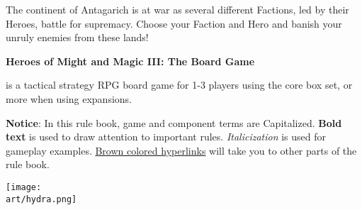 
\bigbreak

The continent of Antagarich is at war as several different Factions, led by their Heroes, battle for supremacy. Choose your Faction and Hero and banish your unruly enemies from these lands!

\hypertarget{Heroes of Might and Magic III}{\textbf{Heroes of Might and Magic III: The Board Game}} is a tactical strategy RPG board game for 1-3 players using the core box set, or more when using expansions.

\begin{multicols}{2}
\textbf{Notice}: In this rule book, game and component terms are Capitalized.
\textbf{Bold text} is used to draw attention to important rules.
\textit{Italicization} is used for gameplay examples.
\hyperlink{Heroes of Might and Magic III}{Brown colored hyperlinks} will take you to other parts of the rule book.
\phantom{
  
  
  
  
  
  
  
}
\vfill
\columnbreak
{}
\vfill
\end{multicols}

\begin{scaledfigure}[blanker]
  \centering
  \texttt{[image: \\art/hydra.png]}
\end{scaledfigure}
